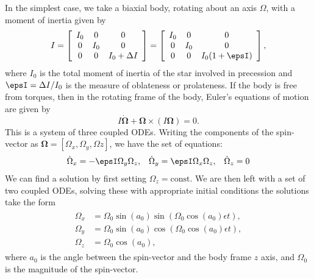 In the simplest case, we take a biaxial body,
rotating about an axis $\Omega$, with a moment of inertia given by
\begin{equation}
    I = \left[\begin{array}{ccc}
            I_{0} & 0 & 0 \\
            0 & I_{0} & 0 \\
            0 & 0 & I_{0} + \Delta I
            \end{array}\right]
      = \left[\begin{array}{ccc}
            I_{0} & 0 & 0 \\
            0 & I_{0} & 0 \\
            0 & 0 & I_{0}(1 + \epsI)
            \end{array}\right],
\label{eqn: MOI}
\end{equation}
where $I_0$ is the total moment of inertia of the star involved in precession
and $\epsI = \Delta I/I_0$ is the measure of oblateness or prolateness. If the
body is free from torques, then in the rotating frame of the body, Euler's
equations of motion \citep{Landau1969} are given by
\begin{equation}
    I\dot{\bm{\Omega}} + \bm{\Omega} \times \left(I\bm{\Omega}\right)=0.
\end{equation}
This is a system of three coupled ODEs. Writing the components of the
spin-vector as $\bm{\Omega} = [\Omega_{x}, \Omega_{y}, \Omega{z}]$, we have the
set of equations:
\begin{align}
\dot{\Omega}_x = -\epsI \Omega_y\Omega_z, &&
\dot{\Omega}_y = \epsI \Omega_x \Omega_z, &&
\dot{\Omega}_z = 0
\end{align}
We can find a solution by first setting $\Omega_{z}=\mathrm{const}$.
We are then left with a set of
two coupled ODEs, solving these with appropriate initial conditions
the solutions take the form
\begin{align}
\begin{split}
    \Omega_{x} & = \Omega_{0}\sin(a_0)\sin\left(\Omega_{0}\cos(a_0)\epsilon t\right), \\
    \Omega_{y} & = \Omega_{0}\sin(a_0)\cos\left(\Omega_{0}\cos(a_0)\epsilon t\right),\\
    \Omega_{z} & = \Omega_0 \cos(a_0),
\label{eqn: free precession}
\end{split}
\end{align}
where $a_0$ is the angle between the spin-vector and the body frame $z$ axis, and
$\Omega_0$ is the magnitude of the spin-vector.

